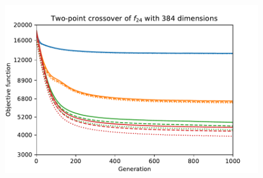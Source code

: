 \begin{figure}[ht!]
\begin{minipage}[t]{0.32\textwidth}
        \includegraphics[width=\textwidth]{img/runs/fitness_es_crossover_f24_dim384_TwoPoint1D.pdf}
    \end{minipage}


\end{figure}

